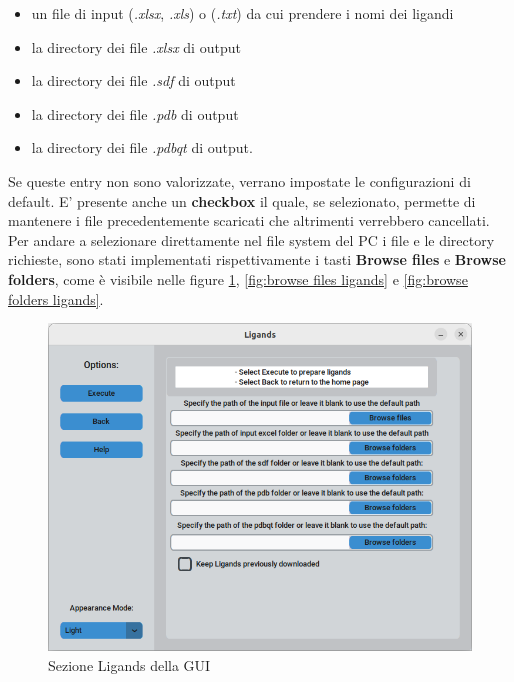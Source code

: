 \begin{itemize}
    \item un file di input (\textit{.xlsx}, \textit{.xls}) o (\textit{.txt}) da cui prendere i nomi dei ligandi
    \item la directory dei file \textit{.xlsx} di output
    \item la directory dei file \textit{.sdf} di output
    \item la directory dei file \textit{.pdb} di output
    \item la directory dei file \textit{.pdbqt} di output.
\end{itemize}

Se queste entry non sono valorizzate, verrano impostate le configurazioni di default. E' presente anche un \textbf{checkbox} il quale, se selezionato, permette di mantenere i file precedentemente scaricati che altrimenti verrebbero cancellati.\newline
Per andare a selezionare direttamente nel file system del PC i file e le directory richieste, sono stati implementati rispettivamente i tasti \textbf{Browse files} e \textbf{Browse folders}, come è visibile nelle figure \ref{fig:ligands}, \ref{fig:browse files ligands} e \ref{fig:browse folders ligands}.

\begin{figure}[H]
    \centering
    \includegraphics[scale=0.6]{immagini/capitolo3/ligands.png}
    \caption{Sezione Ligands della GUI}
    \label{fig:ligands}
\end{figure}

